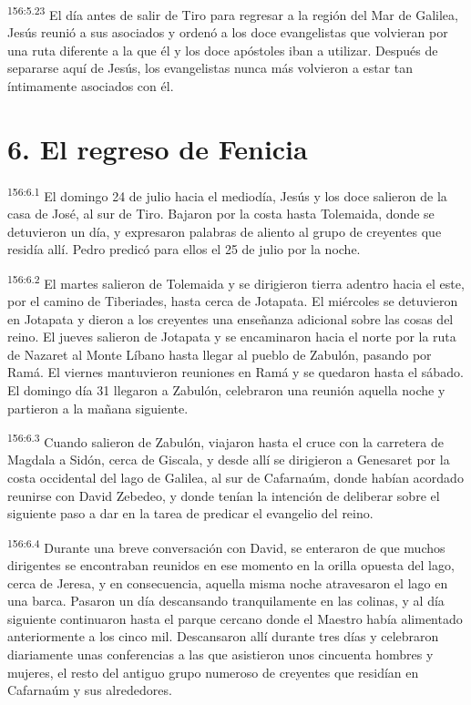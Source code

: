 \par
\textsuperscript{156:5.23} El día antes de salir de Tiro para regresar a la región del Mar de Galilea, Jesús reunió a sus asociados y ordenó a los doce evangelistas que volvieran por una ruta diferente a la que él y los doce apóstoles iban a utilizar. Después de separarse aquí de Jesús, los evangelistas nunca más volvieron a estar tan íntimamente asociados con él.

\section*{6. El regreso de Fenicia}
\par
\textsuperscript{156:6.1} El domingo 24 de julio hacia el mediodía, Jesús y los doce salieron de la casa de José, al sur de Tiro. Bajaron por la costa hasta Tolemaida, donde se detuvieron un día, y expresaron palabras de aliento al grupo de creyentes que residía allí. Pedro predicó para ellos el 25 de julio por la noche.

\par
\textsuperscript{156:6.2} El martes salieron de Tolemaida y se dirigieron tierra adentro hacia el este, por el camino de Tiberiades, hasta cerca de Jotapata. El miércoles se detuvieron en Jotapata y dieron a los creyentes una enseñanza adicional sobre las cosas del reino. El jueves salieron de Jotapata y se encaminaron hacia el norte por la ruta de Nazaret al Monte Líbano hasta llegar al pueblo de Zabulón, pasando por Ramá. El viernes mantuvieron reuniones en Ramá y se quedaron hasta el sábado. El domingo día 31 llegaron a Zabulón, celebraron una reunión aquella noche y partieron a la mañana siguiente.

\par
\textsuperscript{156:6.3} Cuando salieron de Zabulón, viajaron hasta el cruce con la carretera de Magdala a Sidón, cerca de Giscala, y desde allí se dirigieron a Genesaret por la costa occidental del lago de Galilea, al sur de Cafarnaúm, donde habían acordado reunirse con David Zebedeo, y donde tenían la intención de deliberar sobre el siguiente paso a dar en la tarea de predicar el evangelio del reino.

\par
\textsuperscript{156:6.4} Durante una breve conversación con David, se enteraron de que muchos dirigentes se encontraban reunidos en ese momento en la orilla opuesta del lago, cerca de Jeresa, y en consecuencia, aquella misma noche atravesaron el lago en una barca. Pasaron un día descansando tranquilamente en las colinas, y al día siguiente continuaron hasta el parque cercano donde el Maestro había alimentado anteriormente a los cinco mil. Descansaron allí durante tres días y celebraron diariamente unas conferencias a las que asistieron unos cincuenta hombres y mujeres, el resto del antiguo grupo numeroso de creyentes que residían en Cafarnaúm y sus alrededores.


